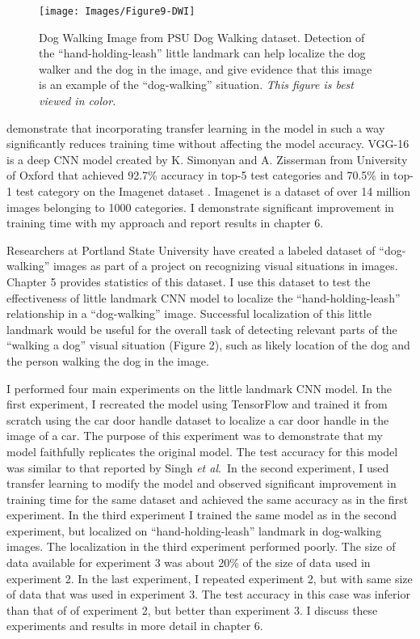 \documentclass [11pt,letterpaper ,openany ]{report}
\begin{document}
    \begin{wrapfigure}{r}[9mm]{0.5\textwidth}
        \begin{center}
            \texttt{[image: Images/Figure9-DWI]}
        \end{center}
        \caption{Dog Walking Image from PSU Dog Walking dataset. Detection of the ``hand-holding-leash'' little landmark can help localize the dog walker and the dog in the image, and give evidence that this image is an example of the ``dog-walking'' situation. \textit{This figure is best viewed in color.}}
    \end{wrapfigure}    

    \noindent
    demonstrate that incorporating transfer learning in the model in such a way significantly reduces training time without affecting the model accuracy. VGG-16 is a deep CNN model created by K. Simonyan and A. Zisserman from University of Oxford that achieved 92.7\% accuracy in top-5 test categories and 70.5\% in top-1 test category on the Imagenet dataset \cite{russakovsky2015imagenet}. Imagenet is a dataset of over 14 million images belonging to 1000 categories. I demonstrate significant improvement in training time with my approach and report results in chapter 6.

    Researchers at Portland State University have created a labeled dataset of ``dog-walking'' images as part of a project on recognizing visual situations in images. Chapter 5 provides statistics of this dataset. I use this dataset to test the effectiveness of little landmark CNN model to localize the ``hand-holding-leash'' relationship in a ``dog-walking'' image. Successful localization of this little landmark would be useful for the overall task of detecting relevant parts of the ``walking a dog'' visual situation (Figure 2), such as likely location of the dog and the person walking the dog in the image.

    I performed four main experiments on the little landmark CNN model. In the first experiment, I recreated the model using TensorFlow \cite{girija2016tensorflow} and trained it from scratch using the car door handle dataset to localize a car door handle in the image of a car. The purpose of this experiment was to demonstrate that my model faithfully replicates the original model. The test accuracy for this model was similar to that reported by Singh \textit{et al}.\ In the second experiment, I used transfer learning to modify the model and observed significant improvement in training time for the same dataset and achieved the same accuracy as in the first experiment. In the third experiment I trained the same model as in the second experiment, but localized on ``hand-holding-leash'' landmark in dog-walking images. The localization in the third experiment performed poorly. The size of data available for experiment 3 was about 20\% of the size of data used in experiment 2. In the last experiment, I repeated experiment 2, but with same size of data that was used in experiment 3. The test accuracy in this case was inferior than that of of experiment 2, but better than experiment 3. I discuss these experiments and results in more detail in chapter 6.
\end{document}
